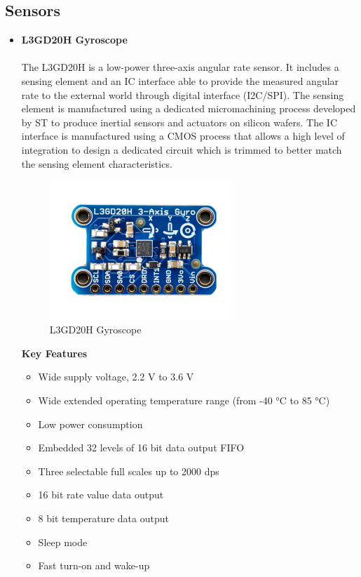 \newpage

\subsection{Sensors}

\begin{itemize}[wide, labelwidth=!, labelindent=0pt]
    \item \textbf{L3GD20H Gyroscope}
    \vspace{-0.5cm}
    \paragraph{}The L3GD20H is a low-power three-axis angular rate sensor. It includes a sensing element and an IC interface able to provide the measured angular rate to the external world through digital interface (I2C/SPI). The sensing element is manufactured using a dedicated micromachining process developed by ST to produce inertial sensors and actuators on silicon wafers. The IC interface is manufactured using a CMOS process that allows a high level of integration to design a dedicated circuit which is trimmed to better match the sensing element characteristics. 
    
    \begin{figure}[H]
    \centering
    \includegraphics[width = 7cm]{project/images/L3GD20H.jpg.png}
    \caption{L3GD20H Gyroscope}
    \end{figure}
    
    \begin{center}{\textbf{Key Features}}\end{center}
    
    \begin{itemize}
        \item Wide supply voltage, 2.2 V to 3.6 V
        \item Wide extended operating temperature range (from -40 °C to 85 °C)
        \item Low power consumption
        \item Embedded 32 levels of 16 bit data output FIFO
        \item Three selectable full scales up to 2000 dps
        \item 16 bit rate value data output
        \item 8 bit temperature data output
        \item Sleep mode
        \item Fast turn-on and wake-up
    \end{itemize}
    

\end{itemize}
